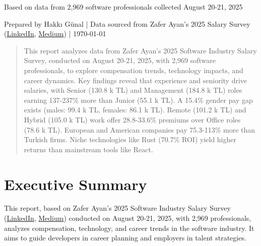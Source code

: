 \documentclass[12pt,a4paper]{article}
\begin{document}
\begin{titlepage}
{\begin{minipage}{0.8\textwidth}
        \end{minipage}
    \par}
    \vspace{1cm}
    {\normalsize \color{darkgray} Based on data from 2,969 software professionals collected August 20-21, 2025\par}
    \vspace{0.5cm}
    {\small \color{darkgray} Prepared by Hakkı Günal | Data sourced from Zafer Ayan's 2025 Salary Survey (\href{https://www.linkedin.com/posts/zaferayan_geleneksel-maa\%C5\%9F-anketi-buyrun-httpslnkdin-activity-7363866008664629248-7YcQ}{LinkedIn}, \href{https://zaferayan.medium.com/2025-a\%C4\%9Fustos-detayl\%C4\%B1-maa\%C5\%9F-anketi-98446d71920a}{Medium}) | \today}
    \vfill
\end{titlepage}

\pagestyle{fancy}

\tableofcontents
\newpage

\begin{abstract}
This report analyzes data from Zafer Ayan's 2025 Software Industry Salary Survey, conducted on August 20-21, 2025, with 2,969 software professionals, to explore compensation trends, technology impacts, and career dynamics. Key findings reveal that experience and seniority drive salaries, with Senior (130.8 k TL) and Management (184.8 k TL) roles earning 137-237\% more than Junior (55.1 k TL). A 15.4\% gender pay gap exists (males: 99.4 k TL, females: 86.1 k TL). Remote (101.2 k TL) and Hybrid (105.0 k TL) work offer 28.8-33.6\% premiums over Office roles (78.6 k TL). European and American companies pay 75.3-113\% more than Turkish firms. Niche technologies like Rust (70.7\% ROI) yield higher returns than mainstream tools like React. 
\end{abstract}

\section{Executive Summary}

This report, based on Zafer Ayan's 2025 Software Industry Salary Survey (\href{https://www.linkedin.com/posts/zaferayan_geleneksel-maa%C5%9F-anketi-buyrun-httpslnkdin-activity-7363866008664629248-7YcQ}{LinkedIn}, \href{https://zaferayan.medium.com/2025-a%C4%9Fustos-detayl%C4%B1-maa%C5%9F-anketi-98446d71920a}{Medium}) conducted on August 20-21, 2025, with 2,969 professionals, analyzes compensation, technology, and career trends in the software industry. It aims to guide developers in career planning and employers in talent strategies.
\end{document}
